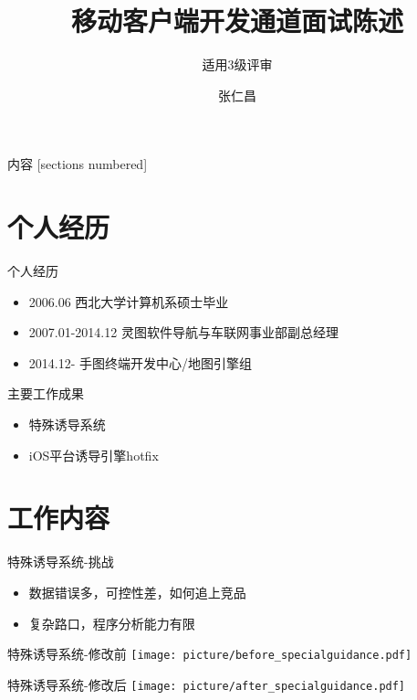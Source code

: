 \documentclass[10pt]{beamer}
\title{移动客户端开发通道面试陈述}
\subtitle{适用3级评审}
\author{张仁昌}
\institute{地图平台部/手图终端开发中心/地图引擎组}
\begin{document}
\maketitle

\begin{frame}{内容}
  [sections numbered]
  \tableofcontents[hideallsubsections]
\end{frame}

\section{个人经历}

\begin{frame}[fragile]{个人经历}
	\begin{itemize}
		\item 2006.06 西北大学计算机系硕士毕业
		\item 2007.01-2014.12 灵图软件导航与车联网事业部副总经理
		\item 2014.12- 手图终端开发中心/地图引擎组
	\end{itemize}
\end{frame}

\begin{frame}[fragile]{主要工作成果}
	\begin{itemize}
		\item 特殊诱导系统
		\item iOS平台诱导引擎hotfix
	\end{itemize}
\end{frame}

\section{工作内容}
								
\begin{frame}{特殊诱导系统-挑战}
  \begin{itemize}
    \item 数据错误多，可控性差，如何追上竞品
    \item 复杂路口，程序分析能力有限
  \end{itemize}
\end{frame}

\begin{frame}{特殊诱导系统-修改前}
\texttt{[image: picture/before\_specialguidance.pdf]}
\end{frame}

\begin{frame}{特殊诱导系统-修改后}
\texttt{[image: picture/after\_specialguidance.pdf]}
\end{frame}
\end{document}
